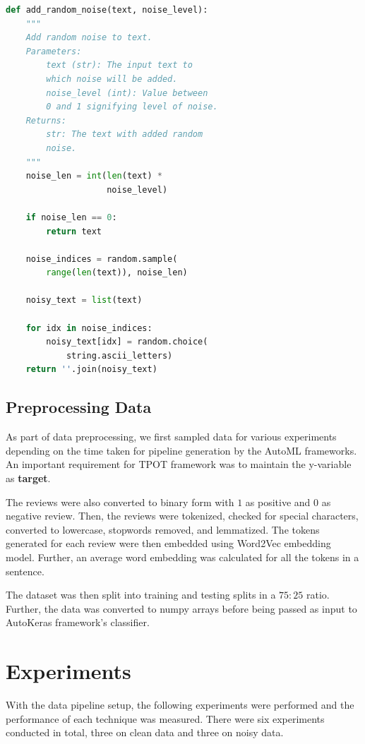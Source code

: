 \documentclass{article}
\begin{document}
\begin{lstlisting}[language=Python, caption=Random Noise]
def add_random_noise(text, noise_level):
    """
    Add random noise to text.
    Parameters:
        text (str): The input text to 
        which noise will be added.
        noise_level (int): Value between 
        0 and 1 signifying level of noise.
    Returns:
        str: The text with added random 
        noise.
    """
    noise_len = int(len(text) * 
                    noise_level)

    if noise_len == 0:
        return text
   
    noise_indices = random.sample(
        range(len(text)), noise_len)
   
    noisy_text = list(text)
 
    for idx in noise_indices:
        noisy_text[idx] = random.choice(
            string.ascii_letters)
    return ''.join(noisy_text)
\end{lstlisting}

\subsection{Preprocessing Data}
As part of data preprocessing, we first sampled data for various experiments depending on the time taken for pipeline generation by the AutoML frameworks. An important requirement for TPOT framework was to maintain the y-variable as \textbf{target}.

The reviews were also converted to binary form with $1$ as positive and $0$ as negative review. Then, the reviews were tokenized, checked for special characters, converted to lowercase, stopwords removed, and lemmatized. The tokens generated for each review were then embedded using Word2Vec embedding model. Further, an average word embedding was calculated for all the tokens in a sentence. 

The dataset was then split into training and testing splits in a $75:25$ ratio. Further, the data was converted to numpy arrays before being passed as input to AutoKeras framework's classifier.  
\section{Experiments}
With the data pipeline setup, the following experiments were performed and the performance of each technique was measured. There were six experiments conducted in total, three on clean data and three on noisy data.
\end{document}

